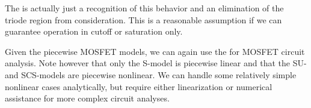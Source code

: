 \documentclass[electronics.tex]{subfiles}
\begin{document}
The  is actually just a recognition of this behavior and an elimination of the triode region from consideration.
This is a reasonable assumption if we can guarantee operation in cutoff or saturation only.
\tags{}

Given the piecewise MOSFET models, we can again use the  for MOSFET circuit analysis.
Note however that only the S-model is piecewise linear and that the SU- and SCS-models are piecewise nonlinear.
We can handle some relatively simple nonlinear cases analytically, but require either linearization or numerical assistance for more complex circuit analyses.
\tags{}
\end{document}
